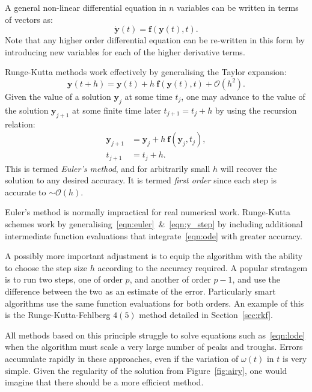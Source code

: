 A general non-linear differential equation in $n$ variables can be written in terms of vectors as:
\begin{equation}
  \dot{\mathbf{y}}(t) = \mathbf{f}(\mathbf{y}(t),t).
  \label{eqn:ode}
\end{equation}
Note that any higher order differential equation can be re-written in this form by introducing new variables for each of the higher derivative terms.

Runge-Kutta methods work effectively by generalising the Taylor expansion:
\begin{equation}
  \mathbf{y}(t+h)  = \mathbf{y}(t) + h\:\mathbf{f}(\mathbf{y}(t),t) + \mathcal{O}(h^2).
  \label{eqn:euler}
\end{equation}
Given the value of a solution $\mathbf{y}_j$ at some time $t_j$, one may advance to the value of the solution $\mathbf{y}_{j+1}$ at some finite time later $t_{j+1} = t_j + h$ by using the recursion relation:
\begin{align}
  \mathbf{y}_{j+1} &=  \mathbf{y}_{j} + h\:\mathbf{f}(\mathbf{y}_j,t_j),
  \label{eqn:y_step}\\
  t_{j+1} &=  t_{j} + h.
  \label{eqn:t_step}
\end{align}
This is termed {\em Euler's method}, and for arbitrarily small $h$ will recover the solution to any desired accuracy. It is termed {\em first order\/} since each step is accurate to $\sim \mathcal{O}(h)$.

Euler's method is normally impractical for real numerical work. Runge-Kutta schemes work by generalising~\eqref{eqn:euler}~\&~\eqref{eqn:y_step} by including additional intermediate function evaluations that integrate~\eqref{eqn:ode} with greater accuracy.

A possibly more important adjustment is to equip the algorithm with the ability to choose the step size $h$ according to the accuracy required. A popular stratagem is to run two steps, one of order $p$, and another of order $p-1$, and use the difference between the two as an estimate of the error. Particularly smart algorithms use the same function evaluations for both orders. An example of this is the Runge-Kutta-Fehlberg $4(5)$ method detailed in Section~\ref{sec:rkf}.

All methods based on this principle struggle to solve equations such as~\eqref{eqn:lode} when the algorithm must scale a very large number of peaks and troughs. Errors accumulate rapidly in these approaches, even if the variation of $\omega(t)$ in $t$ is very simple. Given the regularity of the solution from Figure~\ref{fig:airy}, one would imagine that there should be a more efficient method.


